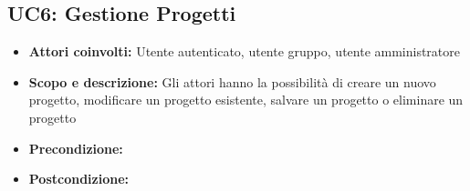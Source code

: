 \subsection{UC6: Gestione Progetti}
\begin{itemize}
		\item \textbf{Attori coinvolti:} Utente autenticato, utente gruppo, utente amministratore \\
		\item \textbf{Scopo e descrizione:} Gli attori hanno la possibilità di creare un nuovo progetto, modificare un progetto esistente, salvare un progetto o eliminare un progetto
		\item \textbf{Precondizione:} 
		\item \textbf{Postcondizione:}
\end{itemize}